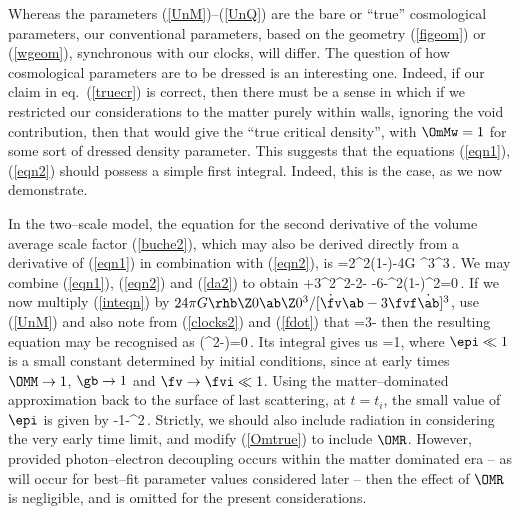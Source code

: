 \documentclass[12pt]{iopart}
\begin{document}
Whereas the parameters
(\ref{UnM})--(\ref{UnQ}) are the bare or ``true'' cosmological parameters,
our conventional parameters, based on the geometry (\ref{figeom}) or
(\ref{wgeom}), synchronous with our clocks, will differ. The question of
how cosmological parameters are to be dressed is an interesting one.
Indeed, if our claim in eq.\ (\ref{truecr}) is correct, then there
must be a sense in which if we restricted our considerations to the
matter purely within walls, ignoring the void contribution, then that
would give the ``true critical density'', with $\OmMw=1$ for some sort of
dressed density parameter. This suggests that the equations
(\ref{eqn1}), (\ref{eqn2}) should possess a simple first integral. Indeed,
this is the case, as we now demonstrate.

In the two--scale model, the equation for the second derivative of
the volume average scale factor (\ref{buche2}), which may also be derived
directly from a derivative of (\ref{eqn1}) in combination with (\ref{eqn2}),
is
\beq
{\ddot\ab\over\ab}={2\dot\fv^2\fv(1-\fv)}-{4\pi G}{\rhb{}}
{\ab{}^3\over\ab^3}\,.\label{da2}
\eeq
We may combine (\ref{eqn1}), (\ref{eqn2}) and (\ref{da2}) to obtain
+3{\dot\ab^2\over\ab^2}-{2\ddot\fv{}-\fv}
-{6\dot\ab\dot\fv\over\ab\fvf}-{\dot\fv^2\over(1-\fv)^2}=0\,.
\label{inteqn}\eeq
If we now multiply (\ref{inteqn}) by $24\pi G{\rhb\Z0}\ab\Z0^3/[\dot\fv\ab
-3\fvf\dot\ab]^3$, use (\ref{UnM}) and also note from (\ref{clocks2}) and
(\ref{fdot}) that
\beq
\gb={3\fvf\dot\ab{}\fvf\dot\ab-\dot\fv\ab}
\label{gam2}\eeq
then the resulting equation may be recognised as
\beq
\Der\dd\ts\left(\gb^2\OMM{}-\fv\right)=0\,.
\eeq
Its integral gives us
\beq
\OmMw{}=1,
\label{Omtrue}\eeq
where $\epi\ll1$ is a small constant determined by initial conditions, since
at early times $\OMM\to1$, $\gb\to1$ and $\fv\to\fvi\ll1$. Using the
matter--dominated approximation back to the surface of last scattering,
at $t=t_i$, the small value of $\epi$ is given by
\beq
{}-{1-\fvi\over\gbi^2\,\Omi}.
\eeq
Strictly, we should also include
radiation in considering the very early time limit, and modify
(\ref{Omtrue}) to include $\OMR$. However, provided
photon--electron decoupling occurs within the matter dominated era -- as will
occur for best--fit parameter values considered later -- then the effect of
$\OMR$ is negligible, and is omitted for the present considerations.
\end{document}
